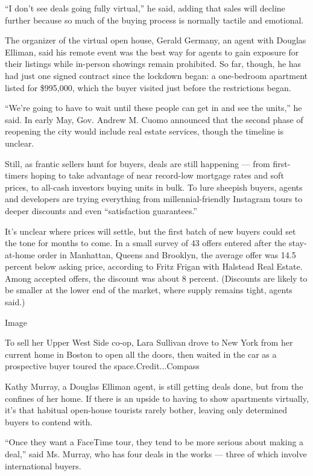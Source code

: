 ``I don't see deals going fully virtual,'' he said, adding that sales
will decline further because so much of the buying process is normally
tactile and emotional.

The organizer of the virtual open house, Gerald Germany, an agent with
Douglas Elliman, said his remote event was the best way for agents to
gain exposure for their listings while in-person showings remain
prohibited. So far, though, he has had just one signed contract since
the lockdown began: a one-bedroom apartment listed for \$995,000, which
the buyer visited just before the restrictions began.

``We're going to have to wait until these people can get in and see the
units,'' he said. In early May, Gov. Andrew M. Cuomo announced that the
second phase of reopening the city would include real estate services,
though the timeline is unclear.

Still, as frantic sellers hunt for buyers, deals are still happening ---
from first-timers hoping to take advantage of near record-low mortgage
rates and soft prices, to all-cash investors buying units in bulk. To
lure sheepish buyers, agents and developers are trying everything from
millennial-friendly Instagram tours to deeper discounts and even
``satisfaction guarantees.''

It's unclear where prices will settle, but the first batch of new buyers
could set the tone for months to come. In a small survey of 43 offers
entered after the stay-at-home order in Manhattan, Queens and Brooklyn,
the average offer was 14.5 percent below asking price, according to
Fritz Frigan with Halstead Real Estate. Among accepted offers, the
discount was about 8 percent. (Discounts are likely to be smaller at the
lower end of the market, where supply remains tight, agents said.)

Image

To sell her Upper West Side co-op, Lara Sullivan drove to New York from
her current home in Boston to open all the doors, then waited in the car
as a prospective buyer toured the space.Credit...Compass

Kathy Murray, a Douglas Elliman agent, is still getting deals done, but
from the confines of her home. If there is an upside to having to show
apartments virtually, it's that habitual open-house tourists rarely
bother, leaving only determined buyers to contend with.

``Once they want a FaceTime tour, they tend to be more serious about
making a deal,'' said Ms. Murray, who has four deals in the works ---
three of which involve international buyers.

